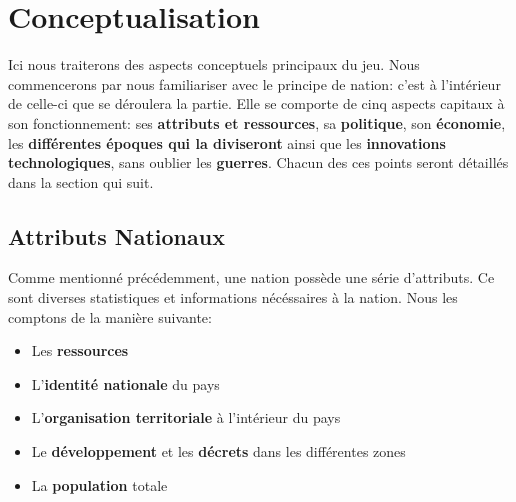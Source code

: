 \documentclass{article}
\begin{document}
\pagebreak

\section{Conceptualisation}
    Ici nous traiterons des aspects conceptuels principaux du jeu. Nous commencerons par nous familiariser avec le principe de nation: c'est à l'intérieur de celle-ci que se déroulera la partie. Elle se comporte de cinq aspects capitaux à son fonctionnement: ses \textbf{attributs et ressources}, sa \textbf{politique}, son \textbf{économie}, les \textbf{différentes époques qui la diviseront} ainsi que les \textbf{innovations technologiques}, sans oublier les \textbf{guerres}. Chacun des ces points seront détaillés dans la section qui suit.
        \subsection{Attributs Nationaux}
            Comme mentionné précédemment, une nation possède une série d'attributs. Ce sont diverses statistiques et informations nécéssaires à la nation. Nous les comptons de la manière suivante:
                \begin{itemize}
                    \item Les \textbf{ressources}
                    \item L'\textbf{identité nationale} du pays
                    \item L'\textbf{organisation territoriale} à l'intérieur du pays 
                    \item Le \textbf{développement} et les \textbf{décrets} dans les différentes zones
                    \item La \textbf{population} totale   
                \end{itemize}
                
\end{document}
